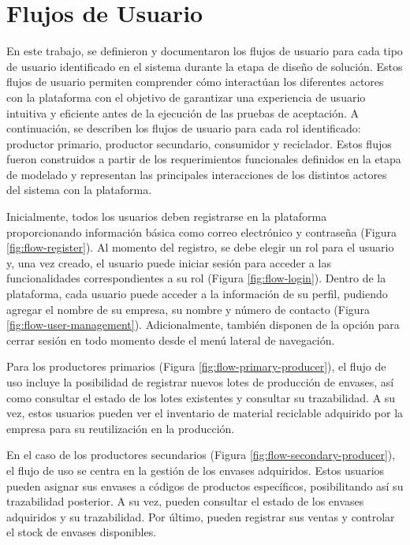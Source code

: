 \chapter{Flujos de Usuario}
\label{cp:user-flows}

\parindent0pt

En este trabajo, se definieron y documentaron los flujos de usuario para cada tipo de usuario identificado en el sistema durante la etapa de diseño de solución. Estos flujos de usuario permiten comprender cómo interactúan los diferentes actores con la plataforma con el objetivo de garantizar una experiencia de usuario intuitiva y eficiente antes de la ejecución de las pruebas de aceptación. A continuación, se describen los flujos de usuario para cada rol identificado: productor primario, productor secundario, consumidor y reciclador. Estos flujos fueron construidos a partir de los requerimientos funcionales definidos en la etapa de modelado y representan las principales interacciones de los distintos actores del sistema con la plataforma.

Inicialmente, todos los usuarios deben registrarse en la plataforma proporcionando información básica como correo electrónico y contraseña (Figura \ref{fig:flow-register}). Al momento del registro, se debe elegir un rol para el usuario y, una vez creado, el usuario puede iniciar sesión para acceder a las funcionalidades correspondientes a su rol (Figura \ref{fig:flow-login}). Dentro de la plataforma, cada usuario puede acceder a la información de su perfil, pudiendo agregar el nombre de su empresa, su nombre y número de contacto (Figura \ref{fig:flow-user-management}). Adicionalmente, también disponen de la opción para cerrar sesión en todo momento desde el menú lateral de navegación.

Para los productores primarios (Figura \ref{fig:flow-primary-producer}), el flujo de uso incluye la posibilidad de registrar nuevos lotes de producción de envases, así como consultar el estado de los lotes existentes y consultar su \gls{trazabilidad}. A su vez, estos usuarios pueden ver el inventario de material reciclable adquirido por la empresa para su reutilización en la producción.

En el caso de los productores secundarios (Figura \ref{fig:flow-secondary-producer}), el flujo de uso se centra en la gestión de los envases adquiridos. Estos usuarios pueden asignar sus envases a códigos de productos específicos, posibilitando así su trazabilidad posterior. A su vez, pueden consultar el estado de los envases adquiridos y su trazabilidad. Por último, pueden registrar sus ventas y controlar el stock de envases disponibles.

